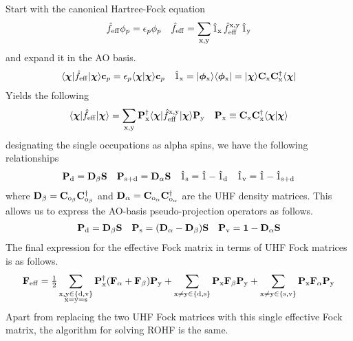 \documentclass[11pt]{article}
\begin{document}
Start with the canonical Hartree-Fock equation
\begin{align}
  \hat{f}_{\mathrm{eff}}
  \phi _p
=
  \epsilon _p
  \phi _p
&&
  \hat{f}_{\mathrm{eff}}
=
  \sum_{\mathrm{x},\mathrm{y}}
  \hat{1}_{\mathrm{x}}
  \,
  \hat{f}_{\mathrm{eff}}^{\mathrm{x},\mathrm{y}}
  \,
  \hat{1}_{\mathrm{y}}
\end{align}
and expand it in the AO basis.
\begin{align}
  \ip{\bm\x|\op{f}_\mr{eff}|\bm\x}
  \bo{c}_p
=
  \ev_p
  \ip{\bm\x|\bm\x}
  \bo{c}_p
&&
  \op{1}_\mr{x}
=
  \kt{\bm\f_\mr{x}}
  \br{\bm\f_\mr{x}}
=
  \kt{\bm\x}
  \bo{C}_\mr{x}
  \bo{C}_\mr{x}\dg
  \br{\bm\x}
\end{align}
Yields the following
\begin{align}
  \ip{\bm\x|\op{f}_\mr{eff}|\bm\x}
=
  \sum_{\mr{x},\mr{y}}
  \bo{P}_\mr{x}\dg
  \ip{\bm\x|\op{f}_\mr{eff}^\mr{x,y}|\bm\x}
  \bo{P}_\mr{y}
&&
  \bo{P}_\mr{x}
\equiv
  \bo{C}_\mr{x}\bo{C}_\mr{x}\dg
  \ip{\bm\x|\bm\x}
\end{align}
designating the single occupations as alpha spins, we have the following relationships
\begin{align}
  \mathbf{P}_{\mathrm{d}}
=
  \mathbf{D}_{\beta }\mathbf{S}
&&
  \mathbf{P}_{\mathrm{s+d}}
=
  \mathbf{D}_{\alpha }\mathbf{S}
&&
  \hat{1}_{\mathrm{s}}
=
  \hat{1}
-
  \hat{1}_{\mathrm{d}}
&&
  \hat{1}_{\mathrm{v}}
=
  \hat{1}
-
  \hat{1}_{\mathrm{s+d}}
\end{align}
where
$
  \mathbf{D}_{\beta }
=
  \mathbf{C}_{\mathrm{o}_{\beta }}
  \mathbf{C}_{\mathrm{o}_{\beta }}^\dagger
$
and
$
  \mathbf{D}_{\alpha }
=
  \mathbf{C}_{\mathrm{o}_{\alpha }}
  \mathbf{C}_{\mathrm{o}_{\alpha }}^\dagger
$
are the UHF density matrices.
This allows us to express the AO-basis pseudo-projection operators as follows.
\begin{align}
  \mathbf{P}_{\mathrm{d}}
=
  \mathbf{D}_{\beta }
  \mathbf{S}
&&
  \mathbf{P}_{\mathrm{s}}
=
  (\mathbf{D}_{\alpha } - \mathbf{D}_{\beta })
  \mathbf{S}
&&
  \mathbf{P}_{\mathrm{v}}
=
  \mathbf{1}
-
  \mathbf{D}_{\alpha }
  \mathbf{S}
\end{align}
The final expression for the effective Fock matrix in terms of UHF Fock matrices is as follows.
\begin{align}
  \mathbf{F}_{\mathrm{eff}}
=
  \tfrac{1}{2}
  \sum_{
    \substack{
      \mathrm{x},\mathrm{y}\in\{\mathrm{d},\mathrm{v}\} \\
      \mathrm{x} = \mathrm{y} = \mathrm{s}
    }
  }
  \mathbf{P}_{\mathrm{x}}^\dagger
  (\mathbf{F}_{\alpha } + \mathbf{F}_{\beta })
  \mathbf{P}_{\mathrm{y}}
+
  \sum_{\mathrm{x}\neq\mathrm{y}\in\{\mathrm{d},\mathrm{s}\}}
  \mathbf{P}_{\mathrm{x}}
  \mathbf{F}_{\beta }
  \mathbf{P}_{\mathrm{y}}
+
  \sum_{\mathrm{x}\neq\mathrm{y}\in\{\mathrm{s},\mathrm{v}\}}
  \mathbf{P}_{\mathrm{x}}
  \mathbf{F}_{\alpha }
  \mathbf{P}_{\mathrm{y}}
\end{align}
Apart from replacing the two UHF Fock matrices with this single effective Fock matrix, the algorithm for solving ROHF is the same.
\end{document}
